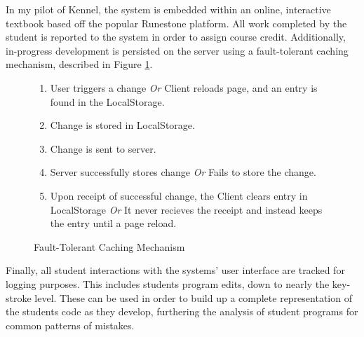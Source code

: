 In my pilot of Kennel, the system is embedded within an online, interactive textbook based off the popular Runestone platform. %
All work completed by the student is reported to the system in order to assign course credit.
Additionally, in-progress development is persisted on the server using a fault-tolerant caching mechanism, described in Figure \ref{ft-cm}.
\begin{figure}
\begin{enumerate}
  \item User triggers a change \textit{Or} Client reloads page, and an entry is found in the LocalStorage.
	\item Change is stored in LocalStorage.
	\item Change is sent to server.
  \item Server successfully stores change \textit{Or} Fails to store the change.
	\item Upon receipt of successful change, the Client clears entry in LocalStorage \textit{Or} It never recieves the receipt and instead keeps the entry until a page reload.
\end{enumerate}
\caption{Fault-Tolerant Caching Mechanism}
\label{ft-cm}
\end{figure}
Finally, all student interactions with the systems' user interface are tracked for logging purposes.
This includes students program edits, down to nearly the key-stroke level.
These can be used in order to build up a complete representation of the students code as they develop, furthering the analysis of student programs for common patterns of mistakes.
